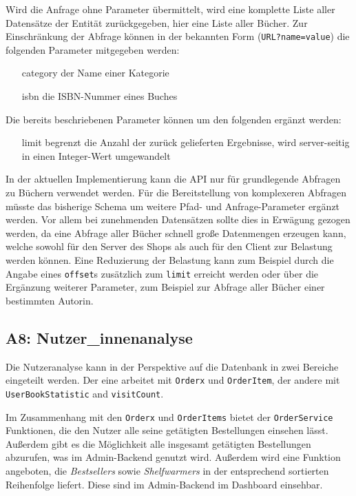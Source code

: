 	Wird die Anfrage ohne Parameter übermittelt, wird eine komplette Liste aller Datensätze der Entität zurückgegeben, hier eine Liste aller Bücher. Zur Einschränkung der Abfrage können in der bekannten Form (\lstinline|URL?name=value|) die folgenden Parameter mitgegeben werden:
	\begin{itemize}
		\item[category] der Name einer Kategorie
		\item[isbn] die ISBN-Nummer eines Buches
	\end{itemize}
	
	Die bereits beschriebenen Parameter können um den folgenden ergänzt werden:
	\begin{itemize}
		\item[limit] begrenzt die Anzahl der zurück gelieferten Ergebnisse, wird server-seitig in einen Integer-Wert umgewandelt
	\end{itemize}
	
	In der aktuellen Implementierung kann die API nur für grundlegende Abfragen zu Büchern verwendet werden. Für die Bereitstellung von komplexeren Abfragen müsste das bisherige Schema um weitere Pfad- und Anfrage-Parameter ergänzt werden. Vor allem bei zunehmenden Datensätzen sollte dies in Erwägung gezogen werden, da eine Abfrage aller Bücher schnell große Datenmengen erzeugen kann, welche sowohl für den Server des Shops als auch für den Client zur Belastung werden können. Eine Reduzierung der Belastung kann zum Beispiel durch die Angabe eines \lstinline|offset|s zusätzlich zum \lstinline|limit| erreicht werden oder über die Ergänzung weiterer Parameter, zum Beispiel zur Abfrage aller Bücher einer bestimmten Autorin.
	
	\subsection{A8: Nutzer\_innenanalyse}\label{sec:umsetzung:analyse}
	Die Nutzeranalyse kann in der Perspektive auf die Datenbank in zwei Bereiche eingeteilt werden. Der eine arbeitet mit \texttt{Orderx} und \texttt{OrderItem}, der andere mit \texttt{User\-Book\-Statistic} and \texttt{visitCount}.
	
	Im Zusammenhang mit den \texttt{Orderx} und \texttt{OrderItems} bietet der \texttt{OrderService} Funktionen, die den Nutzer alle seine getätigten Bestellungen einsehen lässt. Außerdem gibt es die Möglichkeit alle insgesamt getätigten Bestellungen abzurufen, was im Admin-Backend genutzt wird. Außerdem wird eine Funktion angeboten, die \textit{Bestsellers} sowie \textit{Shelfwarmers} in der entsprechend sortierten Reihenfolge liefert. Diese sind im Admin-Backend im Dashboard einsehbar.
	
